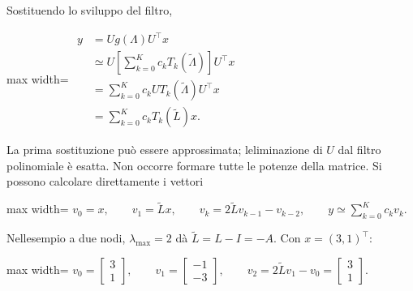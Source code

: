 \documentclass[11pt,a4paper,oneside,openany]{book}
\begin{document}
Sostituendo lo sviluppo del filtro,

\begin{center}
\begin{adjustbox}{max width=\linewidth}
$\displaystyle \begin{aligned}
y&=Ug(\Lambda)U^\top x\\
&\simeq U\left[\sum_{k=0}^Kc_kT_k(\widetilde\Lambda)\right]U^\top x\\
&=\sum_{k=0}^Kc_kUT_k(\widetilde\Lambda)U^\top x\\
&=\sum_{k=0}^Kc_kT_k(\widetilde L)x.
\end{aligned}$
\end{adjustbox}
\end{center}

La prima sostituzione può essere approssimata; l\textquotesingle eliminazione di \(U\) dal filtro polinomiale è esatta. Non occorre formare tutte le potenze della matrice. Si possono calcolare direttamente i vettori

\begin{center}
\begin{adjustbox}{max width=\linewidth}
$\displaystyle v_0=x,\qquad v_1=\widetilde Lx,\qquad
v_k=2\widetilde Lv_{k-1}-v_{k-2},\qquad
y\simeq\sum_{k=0}^Kc_kv_k.$
\end{adjustbox}
\end{center}

Nell\textquotesingle esempio a due nodi, \(\lambda_{\max}=2\) dà \(\widetilde L=L-I=-A\). Con \(x=(3,1)^\top\):

\begin{center}
\begin{adjustbox}{max width=\linewidth}
$\displaystyle v_0=\begin{bmatrix}3\\1\end{bmatrix},\qquad
v_1=\begin{bmatrix}-1\\-3\end{bmatrix},\qquad
v_2=2\widetilde Lv_1-v_0=\begin{bmatrix}3\\1\end{bmatrix}.$
\end{adjustbox}
\end{center}
\end{document}

